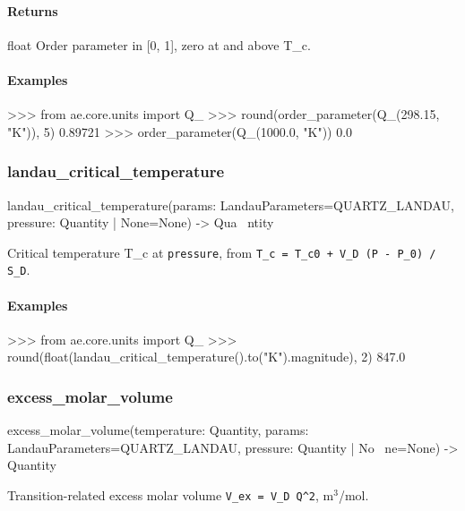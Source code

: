 \documentclass[10pt,a4paper,twoside]{report}
\begin{document}
\paragraph*{Returns}

float Order parameter in [0, 1], zero at and above T\_c.

\paragraph*{Examples}

\begin{doctestblock}
>>> from ae.core.units import Q_
>>> round(order_parameter(Q_(298.15, "K")), 5)
0.89721
>>> order_parameter(Q_(1000.0, "K"))
0.0
\end{doctestblock}

\subsubsection*{landau\_critical\_temperature}

\begin{verbatimsmall}
landau_critical_temperature(params: LandauParameters=QUARTZ_LANDAU, pressure: Quantity | None=None) -> Qua
    \ ntity
\end{verbatimsmall}

Critical temperature T\_c at \texttt{pressure}, from \texttt{T\_c = T\_c0 + V\_D (P - P\_0) / S\_D}.

\paragraph*{Examples}

\begin{doctestblock}
>>> from ae.core.units import Q_
>>> round(float(landau_critical_temperature().to("K").magnitude), 2)
847.0
\end{doctestblock}

\subsubsection*{excess\_molar\_volume}

\begin{verbatimsmall}
excess_molar_volume(temperature: Quantity, params: LandauParameters=QUARTZ_LANDAU, pressure: Quantity | No
    \ ne=None) -> Quantity
\end{verbatimsmall}

Transition-related excess molar volume \texttt{V\_ex = V\_D Q\textasciicircum{}2}, m$^{3}$/mol.
\end{document}
